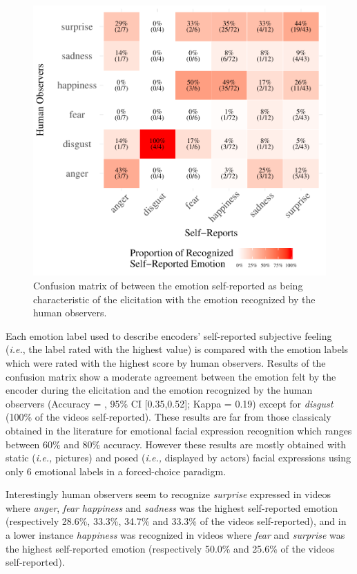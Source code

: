 \documentclass[conference,final,]{IEEEtran}
\makeatletter
\def\maxwidth{\ifdim\Gin@nat@width>\linewidth\linewidth
\else\Gin@nat@width\fi}
\let\Oldincludegraphics\includegraphics
\renewcommand{\includegraphics}[1]{\Oldincludegraphics[width=\maxwidth]{#1}}
\makeatother
\begin{document}
\begin{figure}
\centering
\includegraphics{ACII_2019_paper_files/figure-latex/confusionMatrix_sr_hr-1.pdf}
\caption{\label{fig:confusionMatrix_sr_hr}Confusion matrix of between
the emotion self-reported as being characteristic of the elicitation
with the emotion recognized by the human observers.}
\end{figure}

Each emotion label used to describe encoders' self-reported subjective
feeling (\emph{i.e.}, the label rated with the highest value) is
compared with the emotion labels which were rated with the highest score
by human observers. Results of the confusion matrix show a moderate
agreement between the emotion felt by the encoder during the elicitation
and the emotion recognized by the human observers (Accuracy
\nolinebreak = , 95\% CI {[}0.35,0.52{]}; Kappa = 0.19)
except for \emph{disgust} (100\% of the videos self-reported). These
results are far from those classicaly obtained in the literature for
emotional facial expression recognition which ranges between 60\% and
80\% accuracy. However these results are mostly obtained with static
(\emph{i.e.,} pictures) and posed (\emph{i.e.,} displayed by actors)
facial expressions using only 6 emotional labels in a forced-choice
paradigm.

Interestingly human observers seem to recognize \emph{surprise}
expressed in videos where \emph{anger}, \emph{fear} \emph{happiness} and
\emph{sadness} was the highest self-reported emotion (respectively
28.6\%, 33.3\%, 34.7\% and 33.3\% of the videos self-reported), and in a
lower instance \emph{happiness} was recognized in videos where
\emph{fear} and \emph{surprise} was the highest self-reported emotion
(respectively 50.0\% and 25.6\% of the videos self-reported).
\end{document}
